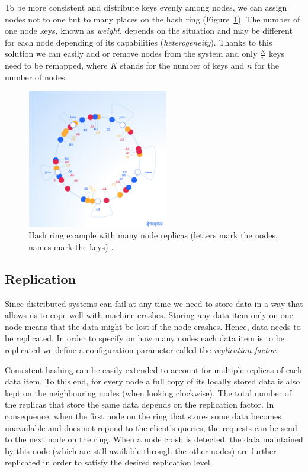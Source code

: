         To be more consistent and distribute keys evenly among nodes, we can assign nodes not to one but to many places on the hash ring (Figure~\ref{ConsistentHashingImage2}).
        The number of one node keys, known as \textit{weight}, depends on the situation and may be different for each node depending of its capabilities (\textit{heterogeneity}). 
        Thanks to this solution we can easily add or remove nodes from the system and only $\frac{K}{n}$ keys need to be remapped, where $K$ stands for the number of keys and $n$ for the number of nodes.
        
        \begin{figure}[ht]
            \centering
                \includegraphics[width=0.55\textwidth]{thesis/figures/vnodes.png}
            \caption{Hash ring example with many node replicas (letters mark the nodes, names mark the keys) \cite{ConsistentHashing}.}
            \label{ConsistentHashingImage2}
        \end{figure}
        
    \subsection{Replication} 
        Since distributed systems can fail at any time we need to store data in a way that allows us to cope well with machine crashes. Storing any data item only on one node means that the data might be lost if the node crashes. Hence, data needs to be replicated. In order to specify on how many nodes each data item is to be replicated we define a configuration parameter called the \textit{replication factor}. 
        
        Consistent hashing can be easily extended to account for multiple replicas of each data item. To this end, for every node a full copy of its locally stored data is also kept on the neighbouring nodes (when looking clockwise). The total number of the replicas that store the same data depends on the replication factor. In consequence, when the first node on the ring that stores some data becomes unavailable and does not repond to the client's queries, the requests can be send to the next node on the ring. When a node crash is detected, the data maintained by this node (which are still available through the other nodes) are further replicated in order to satisfy the desired replication level.
        
